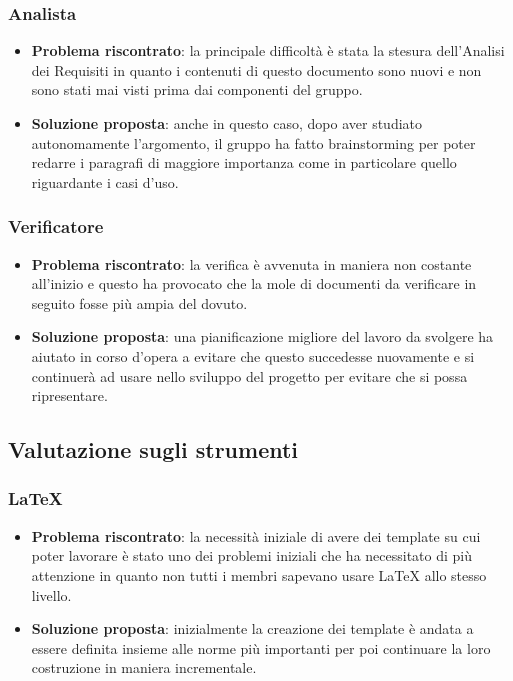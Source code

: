 		\subsubsection{Analista}
			\begin{itemize}
				\item \textbf{Problema riscontrato}: la principale difficoltà è stata la stesura dell'Analisi dei Requisiti in quanto i contenuti di questo documento sono nuovi e non sono stati mai visti prima dai componenti del gruppo.
				\item \textbf{Soluzione proposta}: anche in questo caso, dopo aver studiato autonomamente l'argomento, il gruppo ha fatto brainstorming per poter redarre i paragrafi di maggiore importanza come in particolare quello riguardante i casi d'uso.
			\end{itemize}

		\subsubsection{Verificatore}
			\begin{itemize}
				\item \textbf{Problema riscontrato}: la verifica è avvenuta in maniera non costante all'inizio e questo ha provocato che la mole di documenti da verificare in seguito fosse più ampia del dovuto.
				\item \textbf{Soluzione proposta}: una pianificazione migliore del lavoro da svolgere ha aiutato in corso d'opera a evitare che questo succedesse nuovamente e si continuerà ad usare nello sviluppo del progetto per evitare che si possa ripresentare.
			\end{itemize}

	\subsection{Valutazione sugli strumenti}

		\subsubsection{\LaTeX}
			\begin{itemize}
				\item \textbf{Problema riscontrato}: la necessità iniziale di avere dei template su cui poter lavorare è stato uno dei problemi iniziali che ha necessitato di più attenzione in quanto non tutti i membri sapevano usare {\LaTeX} allo stesso livello.
				\item \textbf{Soluzione proposta}: inizialmente la creazione dei template è andata a essere definita insieme alle norme più importanti per poi continuare la loro costruzione in maniera incrementale.
			\end{itemize}
		
